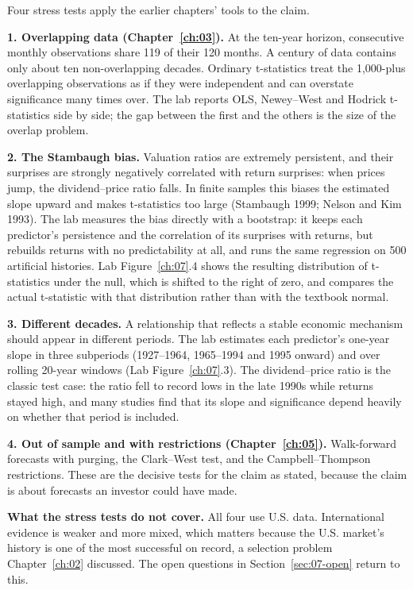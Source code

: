 Four stress tests apply the earlier chapters' tools to the claim.

\textbf{1. Overlapping data (Chapter~\ref{ch:03}).} At the ten-year horizon, consecutive monthly observations share 119 of their 120 months. A century of data contains only about ten non-overlapping decades. Ordinary t-statistics treat the 1,000-plus overlapping observations as if they were independent and can overstate significance many times over. The lab reports OLS, Newey--West and Hodrick t-statistics side by side; the gap between the first and the others is the size of the overlap problem.

\textbf{2. The Stambaugh bias.} Valuation ratios are extremely persistent, and their surprises are strongly negatively correlated with return surprises: when prices jump, the dividend--price ratio falls. In finite samples this biases the estimated slope upward and makes t-statistics too large (Stambaugh 1999; Nelson and Kim 1993). The lab measures the bias directly with a bootstrap: it keeps each predictor's persistence and the correlation of its surprises with returns, but rebuilds returns with no predictability at all, and runs the same regression on 500 artificial histories. Lab Figure~\ref{ch:07}.4 shows the resulting distribution of t-statistics under the null, which is shifted to the right of zero, and compares the actual t-statistic with that distribution rather than with the textbook normal.

\textbf{3. Different decades.} A relationship that reflects a stable economic mechanism should appear in different periods. The lab estimates each predictor's one-year slope in three subperiods (1927--1964, 1965--1994 and 1995 onward) and over rolling 20-year windows (Lab Figure~\ref{ch:07}.3). The dividend--price ratio is the classic test case: the ratio fell to record lows in the late 1990s while returns stayed high, and many studies find that its slope and significance depend heavily on whether that period is included.

\textbf{4. Out of sample and with restrictions (Chapter~\ref{ch:05}).} Walk-forward forecasts with purging, the Clark--West test, and the Campbell--Thompson restrictions. These are the decisive tests for the claim as stated, because the claim is about forecasts an investor could have made.

\textbf{What the stress tests do not cover.} All four use U.S. data. International evidence is weaker and more mixed, which matters because the U.S. market's history is one of the most successful on record, a selection problem Chapter~\ref{ch:02} discussed. The open questions in Section~\ref{sec:07-open} return to this.

